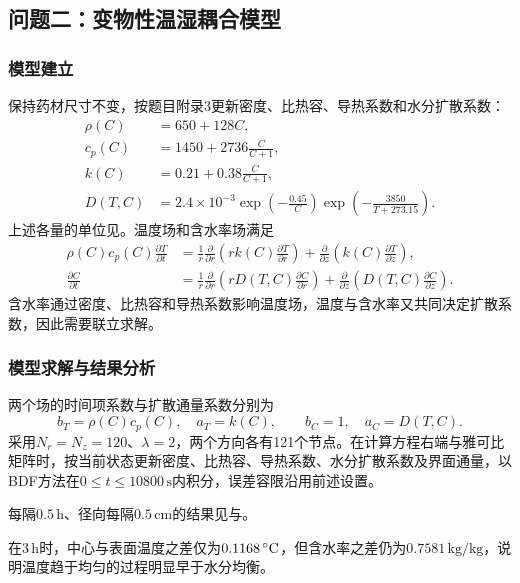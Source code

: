 \FloatBarrier
\subsection{问题二：变物性温湿耦合模型}
\subsubsection{模型建立}
保持药材尺寸不变，按题目附录3更新密度、比热容、导热系数和水分扩散系数：
\begin{equation}\label{eq:q2-properties}
\begin{aligned}
\rho(C)&=650+128C,\\
c_p(C)&=1450+2736\frac{C}{C+1},\\
k(C)&=0.21+0.38\frac{C}{C+1},\\
D(T,C)&=2.4\times10^{-3}
\exp\left(-\frac{0.45}{C}\right)
\exp\left(-\frac{3850}{T+273.15}\right).
\end{aligned}
\end{equation}
上述各量的单位见。温度场和含水率场满足
\begin{equation}\label{eq:q2-pde}
\begin{aligned}
\rho(C)c_p(C)\frac{\partial T}{\partial t}
&=\frac1r\frac{\partial}{\partial r}
\left(rk(C)\frac{\partial T}{\partial r}\right)
+\frac{\partial}{\partial z}\left(k(C)\frac{\partial T}{\partial z}\right),\\
\frac{\partial C}{\partial t}
&=\frac1r\frac{\partial}{\partial r}
\left(rD(T,C)\frac{\partial C}{\partial r}\right)
+\frac{\partial}{\partial z}\left(D(T,C)\frac{\partial C}{\partial z}\right).
\end{aligned}
\end{equation}
含水率通过密度、比热容和导热系数影响温度场，温度与含水率又共同决定扩散系数，因此需要联立求解。

\subsubsection{模型求解与结果分析}
两个场的时间项系数与扩散通量系数分别为
\begin{equation}
b_T=\rho(C)c_p(C),\quad a_T=k(C),\qquad
b_C=1,\quad a_C=D(T,C).
\end{equation}
采用$N_r=N_z=120$、$\lambda=2$，两个方向各有121个节点。在计算方程右端与雅可比矩阵时，按当前状态更新密度、比热容、导热系数、水分扩散系数及界面通量，以BDF方法在$0\le t\le10800\,\mathrm{s}$内积分，误差容限沿用前述设置。

每隔$0.5\,\mathrm{h}$、径向每隔$0.5\,\mathrm{cm}$的结果见与。


在$3\,\mathrm{h}$时，中心与表面温度之差仅为$0.1168\,{}^\circ\mathrm{C}$，但含水率之差仍为$0.7581\,\mathrm{kg/kg}$，说明温度趋于均匀的过程明显早于水分均衡。

